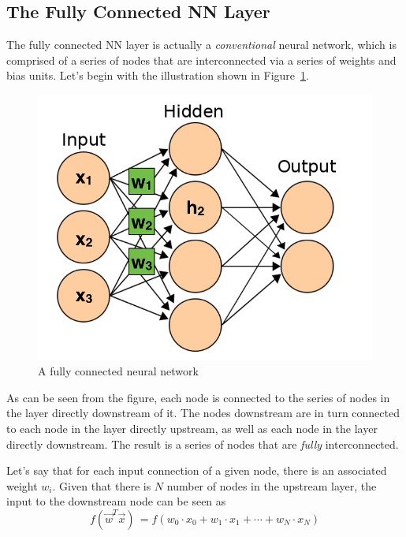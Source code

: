 \documentclass[letterpaper,12pt]{article}
\newcommand{\figref}[1]{Figure~\ref{#1}}
\begin{document}
\subsection{The Fully Connected NN Layer}

The fully connected NN layer is actually a \textit{conventional} neural network, which is comprised of a series of nodes that are interconnected via a series of weights and bias units. Let's begin with the illustration shown in \figref{ann}.

\begin{figure}[htbp]
\begin{center}
\includegraphics[scale=0.5]{images/nn_edit.png}
\caption{A fully connected neural network \cite{ann}}
\label{ann}
\end{center}
\end{figure}

As can be seen from the figure, each node is connected to the series of nodes in the layer directly downstream of it. The nodes downstream are in turn connected to each node in the layer directly upstream, as well as each node in the layer directly downstream. The result is a series of nodes that are \textit{fully} interconnected.

Let's say that for each input connection of a given node, there is an associated weight $w_i$. Given that there is $N$ number of nodes in the upstream layer, the input to the downstream node can be seen as 
\begin{equation}
f(\vec{w}^T\vec{x}) \, = f(w_0 \cdot x_0 + w_1 \cdot x_1 + \cdots + w_N \cdot x_N)
\end{equation}
\end{document}
